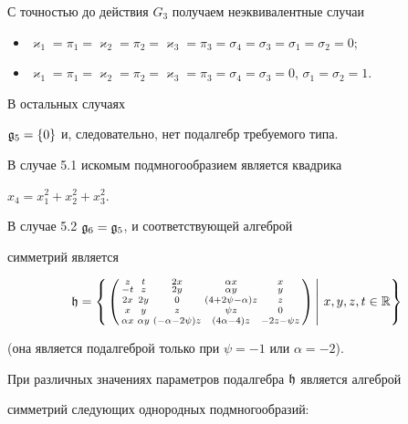 С точностью до действия $G_3$ получаем неэквивалентные случаи


\begin{itemize}


\item[5.1] $\varkappa_1=\pi_1=\varkappa_2=\pi_2=\varkappa_3=


\pi_3=\sigma_4=\sigma_3=\sigma_1=\sigma_2=0$;


\item[5.2] $\varkappa_1=\pi_1=\varkappa_2=\pi_2=\varkappa_3=


\pi_3=\sigma_4=\sigma_3=0$, $\sigma_1=\sigma_2=1$.


\end{itemize}


В остальных случаях 


$\frak g_5=\{0\}$ и, следовательно, нет подалгебр требуемого типа.


 


В случае 5.1 искомым подмногообразием является квадрика


$x_4=x_1^2+x_2^2+x_3^2$.





В случае 5.2 $\frak g_6=\frak g_5$, и соответствующей алгеброй


симметрий является


$$


\h=\left\{\left.\left(\begin{smallmatrix}


z& t&2x&\alpha x&x\\ -t&z&2y &\alpha y&y\\ 


2x&2y&0&(4+2\psi-\alpha) z&z\\ x&y&z&\psi z&0\\


\alpha x&\alpha y&(-\alpha-2\psi)z&(4\alpha-4)z&-2z-\psi z


\end{smallmatrix}\right)


\,\right|\,x,y,z,t\in\Bbb R \right\}


$$


(она является подалгеброй только при $\psi=-1$ или $\alpha=-2$).


При различных значениях параметров подалгебра $\frak h$ является алгеброй


симметрий следующих однородных подмногообразий:


